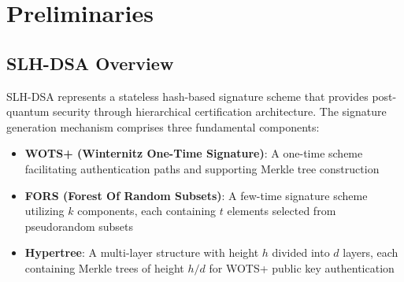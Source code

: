 \documentclass[journal]{IEEEtran}
\begin{document}
\section{Preliminaries}\label{sec:preliminaries}

\subsection{SLH-DSA Overview}

SLH-DSA represents a stateless hash-based signature scheme that provides post-quantum security through hierarchical certification architecture. The signature generation mechanism comprises three fundamental components:

\begin{itemize}
  \item \textbf{WOTS+ (Winternitz One-Time Signature)}: A one-time scheme facilitating authentication paths and supporting Merkle tree construction
  \item \textbf{FORS (Forest Of Random Subsets)}: A few-time signature scheme utilizing $k$ components, each containing $t$ elements selected from pseudorandom subsets
  \item \textbf{Hypertree}: A multi-layer structure with height $h$ divided into $d$ layers, each containing Merkle trees of height $h/d$ for WOTS+ public key authentication
\end{itemize}
\end{document}
